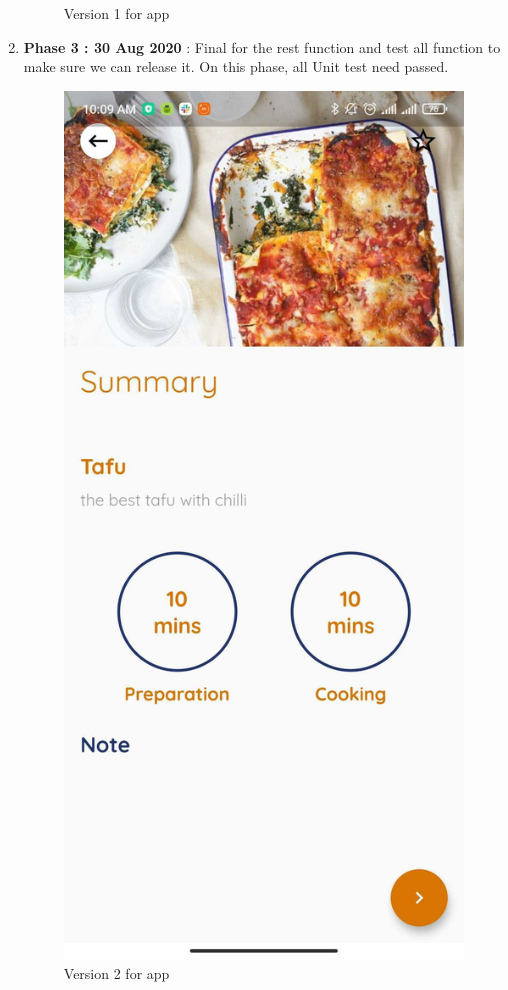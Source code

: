 \documentclass{article}
\begin{document}
\begin{enumerate}
\begin{figure}[h!]
        \caption{Version 1 for app}
        \label{fig:cookingbook}
        \end{figure}

        \item \textbf{Phase 3 : 30 Aug 2020} : Final for the rest function and test all function to make sure we can release it. On this phase, all Unit test need passed.
        \begin{figure}[h!]
        \centering
        \includegraphics[scale=0.17]{Images/Homepage_data.jpg}
        \caption{Version 2 for app}
        \label{fig:cookingbook}
        \end{figure}
    \end{enumerate}
\newpage 
\end{document}
